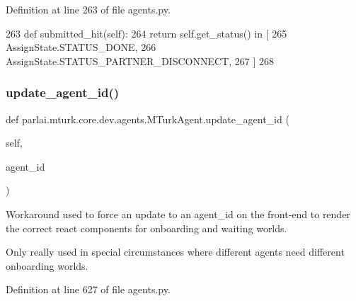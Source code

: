 Definition at line 263 of file agents.\+py.


\begin{DoxyCode}
263     \textcolor{keyword}{def }submitted\_hit(self):
264         \textcolor{keywordflow}{return} self.get\_status() \textcolor{keywordflow}{in} [
265             AssignState.STATUS\_DONE,
266             AssignState.STATUS\_PARTNER\_DISCONNECT,
267         ]
268 
\end{DoxyCode}
\mbox{\label{classparlai_1_1mturk_1_1core_1_1dev_1_1agents_1_1MTurkAgent_a77a8ec97a6c6662dd17cdd9f99d9fce6}} 
\subsubsection{\texorpdfstring{update\+\_\+agent\+\_\+id()}{update\_agent\_id()}}
{\footnotesize\ttfamily def parlai.\+mturk.\+core.\+dev.\+agents.\+M\+Turk\+Agent.\+update\+\_\+agent\+\_\+id (\begin{DoxyParamCaption}\item[{}]{self,  }\item[{}]{agent\+\_\+id }\end{DoxyParamCaption})}

\begin{DoxyVerb}Workaround used to force an update to an agent_id on the front-end to render the
correct react components for onboarding and waiting worlds.

Only really used in special circumstances where different agents need different
onboarding worlds.
\end{DoxyVerb}
 

Definition at line 627 of file agents.\+py.


